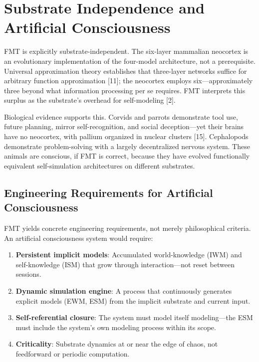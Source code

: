 \documentclass[11pt]{article}
\begin{document}
\section{Substrate Independence and Artificial Consciousness}

FMT is explicitly substrate-independent. The six-layer mammalian neocortex is an evolutionary implementation of the four-model architecture, not a prerequisite. Universal approximation theory establishes that three-layer networks suffice for arbitrary function approximation [11]; the neocortex employs six---approximately three beyond what information processing per se requires. FMT interprets this surplus as the substrate's overhead for self-modeling [2].

Biological evidence supports this. Corvids and parrots demonstrate tool use, future planning, mirror self-recognition, and social deception---yet their brains have no neocortex, with pallium organized in nuclear clusters [15]. Cephalopods demonstrate problem-solving with a largely decentralized nervous system. These animals are conscious, if FMT is correct, because they have evolved functionally equivalent self-simulation architectures on different substrates.

\subsection{Engineering Requirements for Artificial Consciousness}

FMT yields concrete engineering requirements, not merely philosophical criteria. An artificial consciousness system would require:

\begin{enumerate}[nosep]
\item \textbf{Persistent implicit models}: Accumulated world-knowledge (IWM) and self-knowledge (ISM) that grow through interaction---not reset between sessions.
\item \textbf{Dynamic simulation engine}: A process that continuously generates explicit models (EWM, ESM) from the implicit substrate and current input.
\item \textbf{Self-referential closure}: The system must model itself modeling---the ESM must include the system's own modeling process within its scope.
\item \textbf{Criticality}: Substrate dynamics at or near the edge of chaos, not feedforward or periodic computation.
\end{enumerate}
\end{document}

